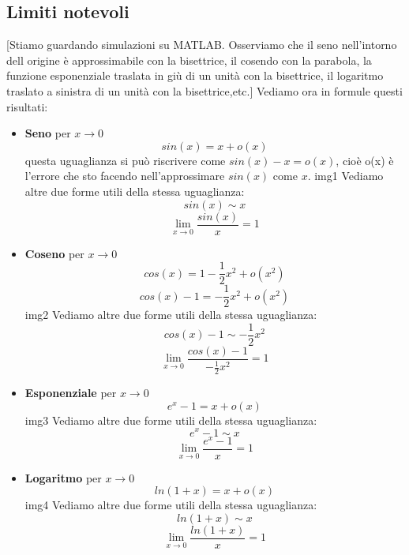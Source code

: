 \subsection*{Limiti notevoli}
[Stiamo guardando simulazioni su MATLAB. Osserviamo che il seno nell'intorno dell origine è approssimabile con la bisettrice, il cosendo con la parabola, la funzione esponenziale traslata in giù di un unità con la bisettrice, il logaritmo traslato a sinistra di un unità con la bisettrice,etc.]
\newline
Vediamo ora in formule questi risultati:
\begin{itemize}
    \item \textbf{Seno} \newline
        per $x \rightarrow 0$
        \[
            sin (x) = x +o(x)
        \]
        questa uguaglianza si può riscrivere come $sin(x) - x = o(x)$, cioè o(x) è l'errore che sto facendo nell'approssimare $sin(x)$ come $x$.
        \newline
        img1
        \newline
        Vediamo altre due forme utili della stessa uguaglianza:
        \[
            sin(x) \sim x
        \]
        \[
            \lim_{x\rightarrow0} \frac{sin(x)}{x} = 1
        \]
    \item \textbf{Coseno} \newline
        per $x \rightarrow 0$
        \[
            cos (x) = 1- \frac{1}{2}x^2 +o(x^2)
        \]
        \[
            cos(x) -1 = -\frac{1}{2}x^2 + o(x^2)
        \]
        img2
        \newline
        Vediamo altre due forme utili della stessa uguaglianza:
        \[
            cos(x) -1 \sim -\frac{1}{2}x^2
        \]
        \[
            \lim_{x\rightarrow 0} \frac{cos(x) -1}{-\frac{1}{2}x^2} = 1
        \]
    \item \textbf{Esponenziale} \newline
        per $x \rightarrow 0$
        \[
            e^x -1 = x+o(x)
        \]
        img3
        \newline
        Vediamo altre due forme utili della stessa uguaglianza:
        \[
            e^x -1 \sim x
        \]
        \[
            \lim_{x\rightarrow 0} \frac{e^x-1}{x} = 1
        \]
    \item \textbf{Logaritmo} \newline
        per $x \rightarrow 0$
        \[
            ln(1+x) = x +o(x) 
        \]
        img4
        \newline
        Vediamo altre due forme utili della stessa uguaglianza:
        \[
            ln(1+x) \sim x 
        \]
        \[
            \lim_{x\rightarrow0}\frac{ln(1+x)}{x} = 1
        \]
\end{itemize}
